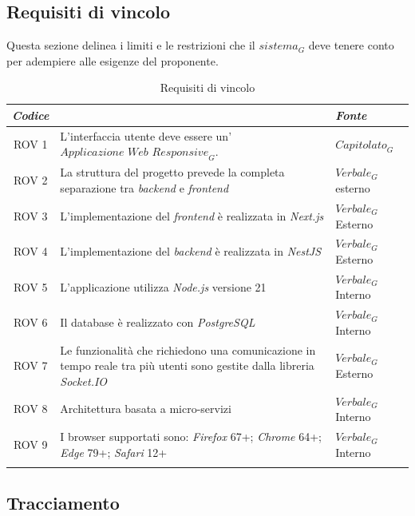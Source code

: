 \documentclass[12pt, oneside]{article}
\begin{document}
\subsection{Requisiti di vincolo}
Questa sezione delinea i limiti e le restrizioni che il $\textit{sistema}_G$ deve tenere conto per adempiere alle esigenze del proponente.
\begin{longtable}{|c|p{14cm}|p{2cm}|}
    \hline
    \emph{Codice} & \centering{\emph{Descrizione}} &  \emph{Fonte} \\
    \hline
    \endfirsthead
    \endhead
    ROV 1& L'interfaccia utente deve essere un'$\textit{Applicazione Web Responsive}_G$.  & $\textit{Capitolato}_G$  \\
    \hline
    ROV 2& La struttura del progetto prevede la completa separazione tra \textit{backend} e \textit{frontend}  & $\textit{Verbale}_G$ esterno  \\
    \hline
    ROV 3& L'implementazione del \textit{frontend} è realizzata in \textit{Next.js}  & $\textit{Verbale}_G$ Esterno  \\
    \hline
    ROV 4& L'implementazione del \textit{backend} è realizzata in \textit{NestJS}  & $\textit{Verbale}_G$ Esterno  \\
    \hline
    ROV 5& L'applicazione utilizza \textit{Node.js} versione 21 & $\textit{Verbale}_G$ Interno  \\
    \hline
    ROV 6& Il database è realizzato con \textit{PostgreSQL}  & $\textit{Verbale}_G$ Interno  \\
    \hline
    ROV 7& Le funzionalità che richiedono una comunicazione in tempo reale tra più utenti sono gestite dalla libreria \textit{Socket.IO}  & $\textit{Verbale}_G$ Esterno  \\
    \hline
    ROV 8& Architettura basata a micro-servizi & $\textit{Verbale}_G$ Interno  \\
    \hline
    ROV 9& I browser supportati sono: \textit{Firefox} 67+; \textit{Chrome} 64+; \textit{Edge} 79+; \textit{Safari} 12+  & $\textit{Verbale}_G$ Interno  \\
    \hline
\caption{Requisiti di vincolo}
\end{longtable}


\setlength{\extrarowheight}{8pt}
\subsection{Tracciamento}
\end{document}
